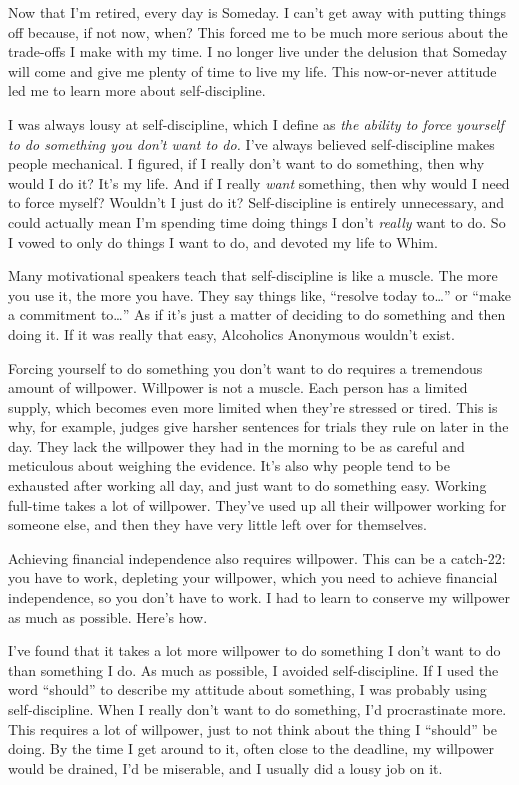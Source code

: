 Now that I'm retired, every day is Someday. I can't get away with putting things off because, if not now, when? This forced me to be much more serious about the trade-offs I make with my time. I no longer live under the delusion that Someday will come and give me plenty of time to live my life. This now-or-never attitude led me to learn more about self-discipline.

I was always lousy at self-discipline, which I define as \emph{the ability to force yourself to do something you don't want to do.} I've always believed self-discipline makes people mechanical. I figured, if I really don't want to do something, then why would I do it? It's my life. And if I really \emph{want} something, then why would I need to force myself? Wouldn't I just do it? Self-discipline is entirely unnecessary, and could actually mean I'm spending time doing things I don't \emph{really} want to do. So I vowed to only do things I want to do, and devoted my life to Whim.

Many motivational speakers teach that self-discipline is like a muscle. The more you use it, the more you have. They say things like, ``resolve today to\ldots'' or ``make a commitment to\ldots'' As if it's just a matter of deciding to do something and then doing it. If it was really that easy, Alcoholics Anonymous wouldn't exist.

Forcing yourself to do something you don't want to do requires a tremendous amount of willpower. Willpower is not a muscle. Each person has a limited supply, which becomes even more limited when they're stressed or tired. This is why, for example, judges give harsher sentences for trials they rule on later in the day. They lack the willpower they had in the morning to be as careful and meticulous about weighing the evidence. It's also why people tend to be exhausted after working all day, and just want to do something easy. Working full-time takes a lot of willpower. They've used up all their willpower working for someone else, and then they have very little left over for themselves.

Achieving financial independence also requires willpower. This can be a catch-22: you have to work, depleting your willpower, which you need to achieve financial independence, so you don't have to work. I had to learn to conserve my willpower as much as possible. Here's how.

I've found that it takes a lot more willpower to do something I don't want to do than something I do. As much as possible, I avoided self-discipline. If I used the word ``should'' to describe my attitude about something, I was probably using self-discipline. When I really don't want to do something, I'd procrastinate more. This requires a lot of willpower, just to not think about the thing I ``should'' be doing. By the time I get around to it, often close to the deadline, my willpower would be drained, I'd be miserable, and I usually did a lousy job on it.

